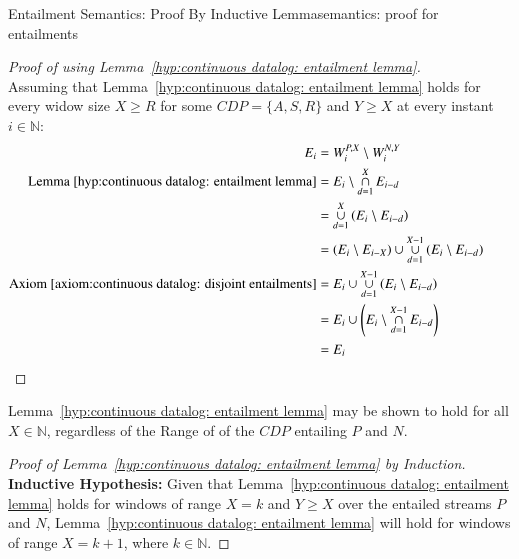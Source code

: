\begin{nestedsection}{Entailment Semantics: Proof By Inductive Lemma}{semantics: proof for entailments}
	\begin{proof}[Proof of  using Lemma~\ref{hyp:continuous datalog: entailment lemma}]\hfill\\
		Assuming that Lemma~\ref{hyp:continuous datalog: entailment lemma} holds for every widow size ${X \geq R}$ for some ${CDP = \{A,S,R\}}$ and ${Y \geq X}$ at every instant ${i \in \mathbb{N}}$:
		\begin{align*}
			E_{i} & = W^{P,X}_{i} \setminus W^{N,Y}_{i} \\
			\text{Lemma~\ref{hyp:continuous datalog: entailment lemma}} & = E_{i} \setminus \mathop{\cap}^{X}_{d=1} E_{i-d} \\
			& = \mathop{\cup}^{X}_{d=1} \left( E_{i} \setminus E_{i-d} \right) \\
			& = \left( E_{i} \setminus E_{i-X} \right) \cup \mathop{\cup}^{X-1}_{d=1} \left( E_{i} \setminus E_{i-d} \right) \\
			\text{Axiom~\ref{axiom:continuous datalog: disjoint entailments}} & = E_{i} \cup \mathop{\cup}^{X-1}_{d=1} \left( E_{i} \setminus E_{i-d} \right) \\
			& = E_{i} \cup \left( E_{i} \setminus \mathop{\cap}^{X-1}_{d=1} E_{i-d} \right) \\
			& = E_{i} && \qedhere
		\end{align*}
	\end{proof}

	Lemma~\ref{hyp:continuous datalog: entailment lemma} may be shown to hold for all ${X \in \mathbb{N}}$, regardless of the Range of of the ${CDP}$ entailing $P$ and $N$.

	\begin{proof}[Proof of Lemma~\ref{hyp:continuous datalog: entailment lemma} by Induction]
		\textbf{Inductive Hypothesis:} Given that Lemma~\ref{hyp:continuous datalog: entailment lemma} holds for windows of range ${X = k}$ and ${Y \geq X}$ over the entailed streams $P$ and $N$, Lemma~\ref{hyp:continuous datalog: entailment lemma} will hold for windows of range ${X = k + 1}$, where ${k \in \mathbb{N}}$.


\end{proof}
\end{nestedsection}
